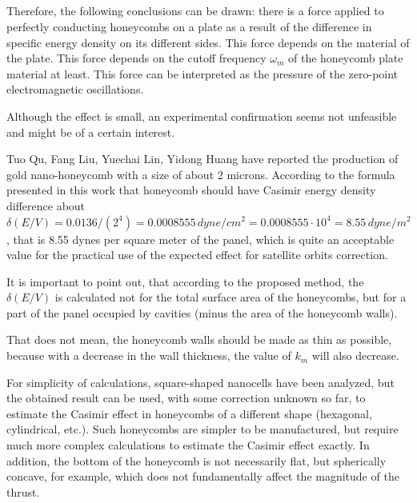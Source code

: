 \documentclass[twoside, 10pt, ptm]{article}
\begin{document}
\begin{multicols}{2}

    \section*{}\label{conclusions}
\vspace{-3.5mm}


    Therefore, the following conclusions can be drawn: there is a force applied
to perfectly conducting honeycombs on a plate as a result of the
difference in specific energy density on its different sides. This force
depends on the material of the plate. This force depends
on the cutoff frequency \(\omega_m\) of the honeycomb plate material at least.
This force can be interpreted as the pressure of the zero-point
electromagnetic oscillations.

    Although the effect is small, an experimental confirmation seems not
unfeasible and might be of a certain interest.

    Tuo Qu, Fang Liu, Yuechai Lin, Yidong Huang \cite{Tuo2019} have reported
the production of gold nano-honeycomb with a size of about 2
microns. According to the formula presented in this work that honeycomb should
have Casimir energy density difference about
\(\delta\left(E/V\right) = 0.0136/({2^4}) = 0.0008555\,dyne/cm^2 = 0.0008555 \cdot 10^4 = 8.55\,dyne/m^2\),
that is 8.55 dynes per square meter of the panel, which is quite
an acceptable value for the practical use of the expected effect for
satellite orbits correction.

    It is important to point out, that according to the proposed method,
the \(\delta\left(E/V\right)\) is
calculated not for the total surface area of the honeycombs, but for a
part of the panel occupied by cavities (minus the area of the
honeycomb walls).

    That does not mean, the honeycomb walls should be made as thin
as possible, because with a decrease in the wall thickness, the value of
\(k_m\) will also decrease.

    For simplicity of calculations, square-shaped nanocells have been analyzed,
but the obtained result can be used, with some correction unknown so far,
to estimate the Casimir effect in honeycombs of a different shape
(hexagonal, cylindrical, etc.). Such honeycombs are simpler to be manufactured,
but require much more complex calculations to estimate the Casimir effect exactly.
In addition, the bottom of the honeycomb is not necessarily flat, but
spherically concave, for example, which does not fundamentally affect
the magnitude of the thrust.


\end{multicols}
\end{document}
